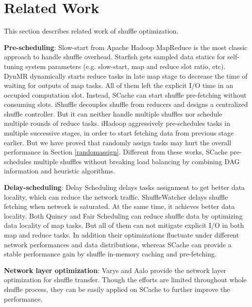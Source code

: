 \section{Related Work}
This section describes related work of shuffle optimization.

\textbf{Pre-scheduling}: Slow-start from Apache Hadoop MapReduce \cite{hadoop} is the most classic approach to handle shuffle overhead. Starfish \cite{starfish} gets sampled data statics for self-tuning system parameters (e.g. slow-start, map and reduce slot ratio, etc). DynMR \cite{dynmr} dynamically starts reduce tasks in late map stage to decrease the time of waiting for outputs of map tasks. All of them left the explicit I/O time in an occupied computation slot. Instead, SCache can start shuffle pre-fetching without consuming slots. iShuffle \cite{ishuffle} decouples shuffle from reducers and designs a centralized shuffle controller. But it can neither handle multiple shuffles nor schedule multiple rounds of reduce tasks. iHadoop \cite{ihadoop} aggressively pre-schedules tasks in multiple successive stages, in order to start fetching data from previous stage earlier. But we have proved that randomly assign tasks may hurt the overall performance in Section \ref{randomassign}. Different from these works, SCache pre-schedules multiple shuffles without breaking load balancing by combining DAG information and heuristic algorithms.

\textbf{Delay-scheduling}: Delay Scheduling \cite{delay} delays tasks assignment to get better data locality, which can reduce the network traffic. ShuffleWatcher \cite{shufflewatcher} delays shuffle fetching when network is saturated. At the same time, it achieves better data locality. Both Quincy \cite{quincy} and Fair Scheduling \cite{preemptive} can reduce shuffle data by optimizing data locality of map tasks. But all of them can not mitigate explicit I/O in both map and reduce tasks. In addition their optimizations fluctuate under different network performances and data distributions, whereas SCache can provide a stable performance gain by shuffle in-memory caching and pre-fetching.

\textbf{Network layer optimization}: Varys \cite{varys} and Aalo \cite{aalo} provide the network layer optimization for shuffle transfer. Though the efforts are limited throughout whole shuffle process, they can be easily applied on SCache to further improve the performance.